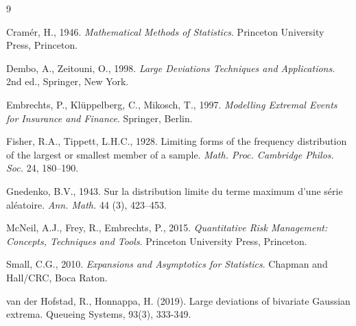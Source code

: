\documentclass[12pt]{article}%
\begin{document}
\begin{thebibliography}{9}

Cramér, H., 1946.
\emph{Mathematical Methods of Statistics}.
Princeton University Press, Princeton.

Dembo, A., Zeitouni, O., 1998.
\emph{Large Deviations Techniques and Applications}.
2nd ed., Springer, New York.

Embrechts, P., Klüppelberg, C., Mikosch, T., 1997.
\emph{Modelling Extremal Events for Insurance and Finance}.
Springer, Berlin.

Fisher, R.A., Tippett, L.H.C., 1928.
Limiting forms of the frequency distribution of the largest or smallest member of a sample.
\emph{Math. Proc. Cambridge Philos. Soc.} 24, 180--190.

Gnedenko, B.V., 1943.
Sur la distribution limite du terme maximum d'une série aléatoire.
\emph{Ann. Math.} 44 (3), 423--453.

McNeil, A.J., Frey, R., Embrechts, P., 2015.
\emph{Quantitative Risk Management: Concepts, Techniques and Tools}.
Princeton University Press, Princeton.

Small, C.G., 2010.
\emph{Expansions and Asymptotics for Statistics}.
Chapman and Hall/CRC, Boca Raton.

van der Hofstad, R., Honnappa, H. (2019). Large deviations of bivariate Gaussian extrema. Queueing Systems, 93(3), 333-349.



\end{thebibliography}
\end{document}
